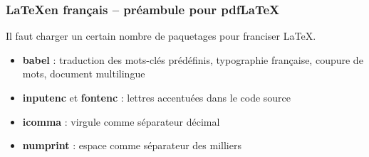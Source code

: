 \begin{frame}[fragile]

	\frametitle{\LaTeX en français -- préambule pour pdf\LaTeX}
	
	Il faut charger un certain nombre de paquetages pour franciser {\LaTeX}.
	
	\begin{codesource}
	\documentclass[french]{memoir}
	\usepackage{babel}
	\usepackage[autolanguage]{numprint}
	\usepackage[utf8]{inputenc}
	\usepackage[T1]{fontenc}
	\usepackage{icomma}
	\end{codesource}

	\pause
	
	\begin{itemize}
		\item \textbf{babel} : traduction des mots-clés prédéfinis, typographie française, coupure de mots, document multilingue
		
		\pause
		
		\item \textbf{inputenc} et \textbf{fontenc} : lettres accentuées dans le code source
		
		\pause
		
		\item \textbf{icomma} : virgule comme séparateur décimal
		
		\pause
		
		\item \textbf{numprint} : espace comme séparateur des milliers
	\end{itemize}
\end{frame}